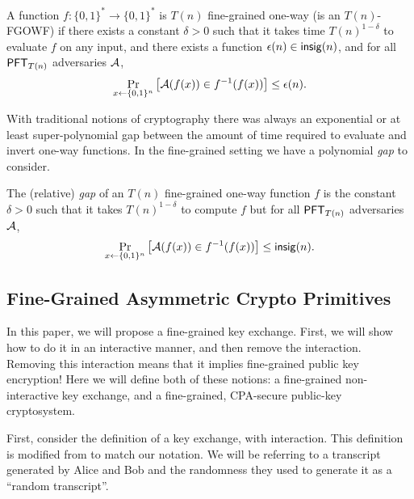 \begin{definition}\label{def:fg-owf}
	A function $f:\{0,1\}^* \to \{0,1\}^*$ is $T(n)$ fine-grained one-way (is an $T(n)$-FGOWF) if there exists a constant $\delta > 0$ such that it takes time $T(n)^{1-\delta}$ to evaluate $f$ on any input, and there exists a function $\epsilon(n) \in \mathsf{insig}(n)$, and for all $\mathsf{PFT}_{T(n)}$ adversaries $\mathcal{A}$,
	\[ \Pr_{x \gets \{0,1\}^n}\left[\mathcal{A}(f(x)) \in f^{-1}(f(x))\right] \le \epsilon(n). \]
\end{definition}

With traditional notions of cryptography there was always an exponential or at least super-polynomial gap between the amount of time required to evaluate and invert one-way functions. In the fine-grained setting we have a polynomial \emph{gap} to consider.
\begin{definition}\label{def:gap}
	The (relative) \emph{gap} of an $T(n)$ fine-grained one-way function $f$ is the constant $\delta > 0$ such that it takes $T(n)^{1-\delta}$ to compute $f$ but for all $\mathsf{PFT}_{T(n)}$ adversaries $\mathcal{A}$,
	\[ \Pr_{x \gets \{0,1\}^n}\left[\mathcal{A}(f(x)) \in f^{-1}(f(x))\right] \le \mathsf{insig}(n). \]
\end{definition}

\subsection{Fine-Grained Asymmetric Crypto Primitives}
In this paper, we will propose a fine-grained key exchange. First, we will show how to do it in an interactive manner, and then remove the interaction. Removing this interaction means that it implies fine-grained public key encryption! Here we will define both of these notions: a fine-grained non-interactive key exchange, and a fine-grained, CPA-secure public-key cryptosystem.

First, consider the definition of a key exchange, with interaction. This definition is modified from \cite{BGI08} to match our notation.
We will be referring to a transcript generated by Alice and Bob and the randomness they used to generate it as a ``random transcript''. 

